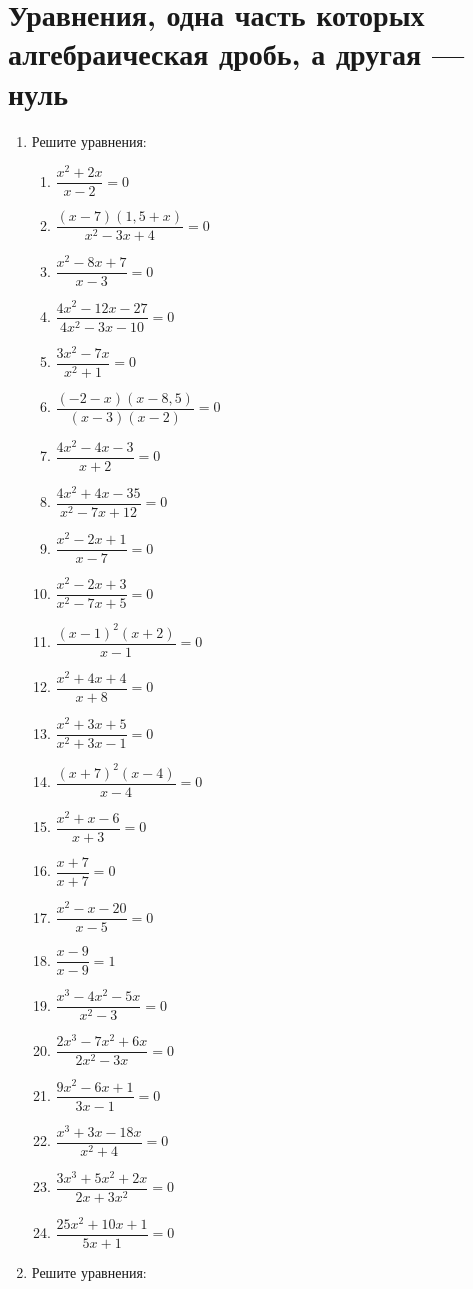 \documentclass[10pt, a4paper]{article}
\begin{document}
\section{Уравнения, одна часть которых алгебраическая дробь, а другая — нуль}
\begin{enumerate}
	\item Решите уравнения:
	\begin{multicols}{2}
		\begin{enumerate}[label=\asbuk*)]
			\item $\dfrac{x^2+2x}{x-2}=0$
			\item $\dfrac{(x-7)(1,5+x)}{x^2-3x+4}=0$
			\item $\dfrac{x^2-8x+7}{x-3}=0$
			\item $\dfrac{4x^2-12x-27}{4x^2-3x-10}=0$
			\item $\dfrac{3x^2-7x}{x^2+1}=0$
			\item $\dfrac{(-2-x)(x-8,5)}{(x-3)(x-2)}=0$
			\item $\dfrac{4x^2-4x-3}{x+2}=0$
			\item $\dfrac{4x^2+4x-35}{x^2-7x+12}=0$
			\item $\dfrac{x^2-2x+1}{x-7}=0$
			\item $\dfrac{x^2-2x+3}{x^2-7x+5}=0$
			\item $\dfrac{(x-1)^2(x+2)}{x-1}=0$
			\item $\dfrac{x^2+4x+4}{x+8}=0$
			\item $\dfrac{x^2+3x+5}{x^2+3x-1}=0$
			\item $\dfrac{(x+7)^2(x-4)}{x-4}=0$
			\item $\dfrac{x^2+x-6}{x+3}=0$
			\item $\dfrac{x+7}{x+7}=0$
			\item $\dfrac{x^2-x-20}{x-5}=0$
			\item $\dfrac{x-9}{x-9}=1$
			\item $\dfrac{x^3-4x^2-5x}{x^2-3}=0$
			\item $\dfrac{2x^3-7x^2+6x}{2x^2-3x}=0$
			\item $\dfrac{9x^2-6x+1}{3x-1}=0$
			\item $\dfrac{x^3+3x-18x}{x^2+4}=0$
			\item $\dfrac{3x^3+5x^2+2x}{2x+3x^2}=0$
			\item $\dfrac{25x^2+10x+1}{5x+1}=0$
		\end{enumerate}
	\end{multicols}
	\item Решите уравнения:
	\begin{multicols}{2}

\end{multicols}
\end{enumerate}
\end{document}
